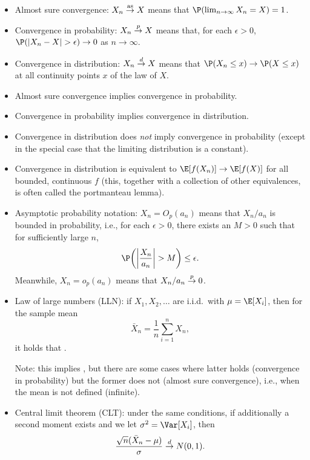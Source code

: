 \documentclass{article}
\begin{document}
\begin{itemize}
\item Almost sure convergence: $X_n \overset{\mathrm{as}}{\to} X$ means that 
  $\P(\lim_{n\to \infty} X_n = X ) = 1$.   

\item Convergence in probability: $X_n \overset{p}{\to} X$ means that, for each
  $\epsilon>0$, $\P(|X_n - X| > \epsilon) \to 0$ as $n \to \infty$.  

\item Convergence in distribution: $X_n \overset{d}{\to} X$ means that $\P(X_n \leq x) \to 
  \P(X \leq x)$ at all continuity points $x$ of the law of $X$. 

\item Almost sure convergence implies convergence in probability. 

\item Convergence in probability implies convergence in distribution.

\item Convergence in distribution does \emph{not} imply convergence in
  probability (except in the special case that the limiting distribution is a
  constant).   

\item Convergence in distribution is equivalent to $\E[ f(X_n) ] \to \E[ f(X) ]$
  for all bounded, continuous $f$ (this, together with a collection of other
  equivalences, is often called the portmanteau lemma).  

\item Asymptotic probability notation: $X_n = O_p(a_n)$ means that $X_n/a_n$ is
  bounded in probability, i.e., for each $\epsilon>0$, there exists an $M>0$
  such that for sufficiently large $n$,
  \[
  \P\bigg( \bigg|\frac{X_n}{a_n}\bigg| > M \bigg) \leq \epsilon.
  \]
  Meanwhile, $X_n = o_p(a_n)$ means that $X_n/a_n \overset{p}{\to} 0$. 

\item Law of large numbers (LLN): if $X_1,X_2,\dots$ are i.i.d.\ with $\mu =
  \E[X_i]$, then for the sample mean 
  \[
  \bar{X}_n = \frac{1}{n} \sum_{i=1}^n X_n,
  \]
  it holds that .

  Note: this implies , but there are some cases
  where latter holds (convergence in probability) but the former does not
  (almost sure convergence), i.e., when the mean is not defined (infinite). 

\item Central limit theorem (CLT): under the same conditions, if additionally a
  second moment exists and we let $\sigma^2 = \Var[X_i]$, then
  \[
  \frac{\sqrt{n}(\bar{X}_n - \mu)}{\sigma} \overset{d}{\to} N(0, 1).
  \]


\end{itemize}
\end{document}
